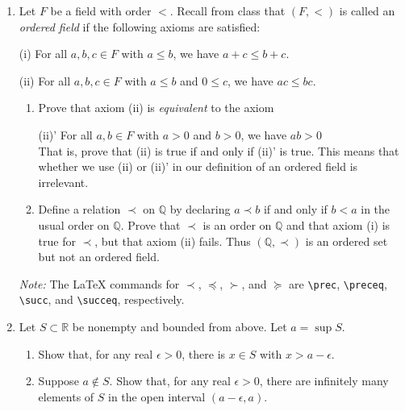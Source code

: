 \documentclass[12pt, letterpaper]{article}
\newcommand{\0}{\mathbf{0}}
\newcommand{\1}{\mathbf{1}}
\begin{document}
\begin{enumerate}
    \vspace{0.5cm}

    \item 
     Let $F$ be a field with order $<$. Recall from class that $(F, <)$ is called an \textit{ordered field} if the following axioms are satisfied:
    
    (i) For all $a, b, c \in F$ with $a \leq b$, we have $a + c \leq b + c$.

        
    (ii) For all $a, b, c \in F$ with $a \leq b$ and $0 \leq c$, we have $ac \leq bc$.\\
    
    \begin{enumerate}
        \item 
        Prove that axiom (ii) is \textit{equivalent} to the axiom

        (ii)' For all $a, b \in F$ with $a > 0$ and $b > 0$, we have $ab > 0$\\ 

        That is, prove that (ii) is true if and only if (ii)' is true. This means that whether we use (ii) or (ii)' in our definition of an ordered field is irrelevant.\\

        \item 
        Define a relation $\prec$ on $\mathbb{Q}$ by declaring $a \prec b$ if and only if $b < a$ in the usual order on $\mathbb{Q}$. Prove that $\prec$ is an order on $\mathbb{Q}$ and that axiom (i) is true for $\prec$, but that axiom (ii) fails. Thus $(\mathbb{Q}, \prec)$ is an ordered set but not an ordered field.
        
    \end{enumerate}

    \textit{Note:} The LaTeX commands for $\prec$, $\preceq$, $\succ$, and $\succeq$ are \verb|\prec|, \verb|\preceq|, \verb|\succ|, and \verb|\succeq|, respectively.
    

    \vspace{0.5cm}

    \item 
    Let $S \subset \mathbb{R}$ be nonempty and bounded from above. Let $a = \sup S$.
    \begin{enumerate}
        \item 
        Show that, for any real $\epsilon > 0$, there is $x \in S$ with $x > a - \epsilon$.

        \item 
        Suppose $a \notin S$. Show that, for any real $\epsilon > 0$, there are infinitely many elements of $S$ in the open interval $(a - \epsilon, a)$.
    \end{enumerate}


\end{enumerate}
\end{document}
